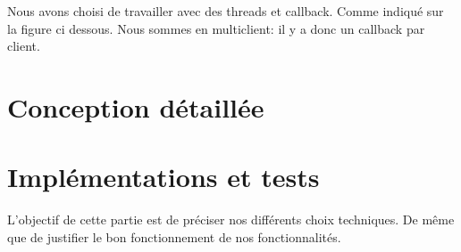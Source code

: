 \documentclass[11pt,dvipsnames,svgnames]{report}
\begin{document}
%
%
%
%
%

Nous avons choisi de travailler avec des threads et callback. Comme indiqué sur la figure ci dessous. Nous sommes en multiclient: il y a donc un callback par client.



\chapter{Conception détaillée}
\chapter{Implémentations et tests}
L'objectif de cette partie est de préciser nos différents choix techniques. De même que de justifier le bon fonctionnement de nos fonctionnalités.
\end{document}
